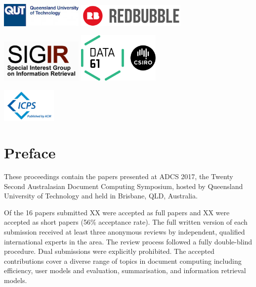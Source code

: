 \documentclass[a4paper]{article}
\begin{document}
\begin{center}
\includegraphics[width=0.3\textwidth]{qut_logo_2lines.jpg} \hspace{4em}
\includegraphics[width=0.4\textwidth]{redbubble.png} 


\vspace{1em}

\includegraphics[width=0.3\textwidth]{sigir-logo.png} \hspace{4em}
\includegraphics[width=0.3\textwidth]{csiro-logo}
\end{center}

\vspace{1in}

\hfill\includegraphics[width=0.2\textwidth]{icps-logo}

\newpage

\section*{Preface}

These proceedings contain the papers presented at ADCS 2017, the Twenty Second 
Australasian Document Computing Symposium, hosted by Queensland University of Technology 
and held in Brisbane, QLD, Australia.

Of the 16 papers submitted XX were accepted as full papers and XX were accepted
as short papers (56\% acceptance rate).  The  full  written  version  of each submission received at
least three anonymous reviews by independent, qualified international experts
in the area. The review process followed a fully double-blind procedure. Dual submissions were explicitly prohibited.  The accepted
contributions cover a diverse range of topics in document computing including efficiency, user models and evaluation, summarisation, and information retrieval
models.
\end{document}
